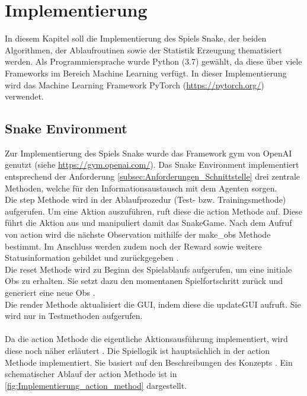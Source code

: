\chapter{Implementierung} \label{chap:Implementierung}
In diesem Kapitel soll die Implementierung des Spiels Snake, der beiden Algorithmen, der Ablaufroutinen sowie der Statistik Erzeugung thematisiert werden. Als Programmiersprache wurde Python (3.7) gewählt, da diese über viele Frameworks im Bereich Machine Learning verfügt.
In dieser Implementierung wird das Machine Learning Framework PyTorch (\url{https://pytorch.org/}) verwendet.

\section{Snake Environment} \label{sec:Implementierung_Environment}
Zur Implementierung des Spiels Snake wurde das Framework gym von OpenAI genutzt (siehe \url{https://gym.openai.com/}). Das Snake Environment implementiert entsprechend der Anforderung \ref{subsec:Anforderungen_Schnittstelle} drei zentrale Methoden, welche für den Informationsaustausch mit dem Agenten sorgen.\\ 
Die step Methode  wird in der Ablaufprozedur (Test- bzw. Trainingsmethode) aufgerufen. Um eine Aktion auszuführen, ruft diese die action Methode auf. Diese führt die Aktion aus und manipuliert damit das SnakeGame.
Nach dem Aufruf von  action wird die nächste Observation mithilfe der make\_obs Methode bestimmt. Im Anschluss werden zudem noch der Reward sowie weitere Statusinformation gebildet und zurückgegeben .\\
Die reset Methode  wird zu Beginn des Spielablaufs aufgerufen, um eine initiale Obs zu erhalten. Sie setzt dazu den momentanen Spielfortschritt zurück und generiert eine neue Obs .\\
Die render Methode  aktualisiert die GUI, indem diese die updateGUI aufruft. Sie wird nur in Testmethoden aufgerufen.\\
\\Da die action Methode die eigentliche Aktionsausführung implementiert, wird diese noch näher erläutert .
Die Spiellogik ist hauptsächlich in der action Methode implementiert. Sie basiert auf den Beschreibungen des Konzepts . Ein schematischer Ablauf der action Methode ist in \autoref{fig:Implementierung_action_method} dargestellt.
